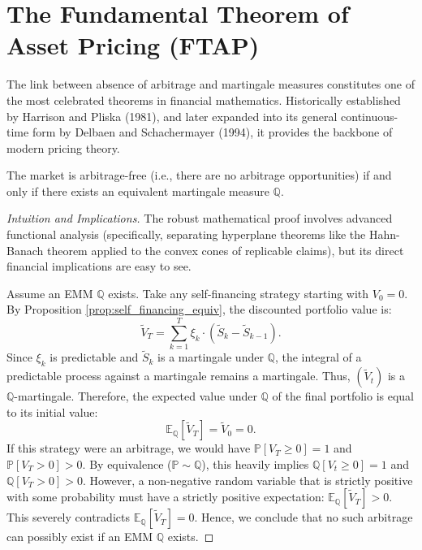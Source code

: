 \section{The Fundamental Theorem of Asset Pricing (FTAP)}

The link between absence of arbitrage and martingale measures constitutes one of the most celebrated theorems in financial mathematics. Historically established by Harrison and Pliska (1981), and later expanded into its general continuous-time form by Delbaen and Schachermayer (1994), it provides the backbone of modern pricing theory.

\begin{theorem}
The market is arbitrage-free (i.e., there are no arbitrage opportunities) if and only if there exists an equivalent martingale measure $\mathbb{Q}$.
\end{theorem}

\begin{proof}[Intuition and Implications]
The robust mathematical proof involves advanced functional analysis (specifically, separating hyperplane theorems like the Hahn-Banach theorem applied to the convex cones of replicable claims), but its direct financial implications are easy to see.

Assume an EMM $\mathbb{Q}$ exists. Take any self-financing strategy starting with $V_0 = 0$. By Proposition \ref{prop:self_financing_equiv}, the discounted portfolio value is:
$$
\tilde{V}_T = \sum_{k=1}^T \xi_k \cdot (\tilde{S}_k - \tilde{S}_{k-1}).
$$
Since $\xi_k$ is predictable and $\tilde{S}_k$ is a martingale under $\mathbb{Q}$, the integral of a predictable process against a martingale remains a martingale. Thus, $(\tilde{V}_t)$ is a $\mathbb{Q}$-martingale.
Therefore, the expected value under $\mathbb{Q}$ of the final portfolio is equal to its initial value:
$$
\mathbb{E}_{\mathbb{Q}}[\tilde{V}_T] = \tilde{V}_0 = 0.
$$
If this strategy were an arbitrage, we would have $\mathbb{P}[V_T \geq 0] = 1$ and $\mathbb{P}[V_T > 0] > 0$. By equivalence ($\mathbb{P} \sim \mathbb{Q}$), this heavily implies $\mathbb{Q}[V_t \geq 0] = 1$ and $\mathbb{Q}[V_T > 0] > 0$. However, a non-negative random variable that is strictly positive with some probability must have a strictly positive expectation: $\mathbb{E}_{\mathbb{Q}}[\tilde{V}_T] > 0$. This severely contradicts $\mathbb{E}_{\mathbb{Q}}[\tilde{V}_T] = 0$. Hence, we conclude that no such arbitrage can possibly exist if an EMM $\mathbb{Q}$ exists.
\end{proof}
